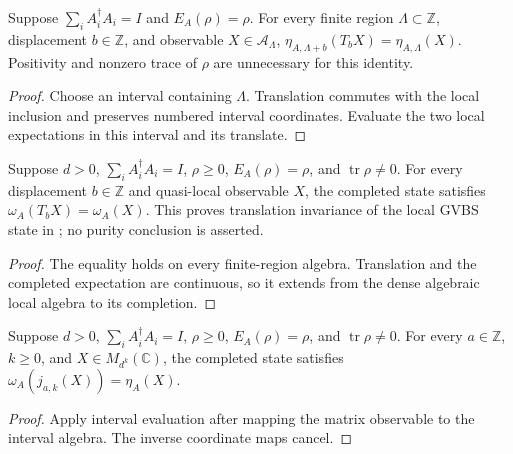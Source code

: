 \begin{lemma}
    \label{thm:mps_finite_region_translation_invariance}
    \leanok
    Suppose $\sum_i A_i^\dagger A_i=I$ and $E_A(\rho)=\rho$.
    For every finite region $\Lambda\subset\mathbb Z$, displacement
    $b\in\mathbb Z$, and observable $X\in\mathcal A_\Lambda$,
    $\eta_{A,\Lambda+b}(T_bX)=\eta_{A,\Lambda}(X)$.
    Positivity and nonzero trace of $\rho$ are unnecessary for this identity.
\end{lemma}
\begin{proof}\leanok
    Choose an interval containing $\Lambda$. Translation commutes with the
    local inclusion and preserves numbered interval coordinates. Evaluate
    the two local expectations in this interval and its translate.
\end{proof}

\begin{lemma}
    \label{thm:mps_quasi_local_translation_invariance}
    \leanok
    Suppose $d>0$, $\sum_i A_i^\dagger A_i=I$, $\rho\geq0$,
    $E_A(\rho)=\rho$, and $\operatorname{tr}\rho\neq0$.
    For every displacement $b\in\mathbb Z$ and quasi-local observable $X$,
    the completed state satisfies $\omega_A(T_bX)=\omega_A(X)$.
    This proves translation invariance of the local GVBS state in
    \cite[Section~3, equations (3.1)--(3.2b)]{Nachtergaele1996Spectral};
    no purity conclusion is asserted.
\end{lemma}
\begin{proof}\leanok
    The equality holds on every finite-region algebra. Translation and the
    completed expectation are continuous, so it extends from the dense
    algebraic local algebra to its completion.
\end{proof}

\begin{lemma}
    \label{thm:mps_quasi_local_interval_expectation}
    \leanok
    Suppose $d>0$, $\sum_i A_i^\dagger A_i=I$, $\rho\geq0$,
    $E_A(\rho)=\rho$, and $\operatorname{tr}\rho\neq0$.
    For every $a\in\mathbb Z$, $k\geq0$, and $X\in M_{d^k}(\mathbb C)$,
    the completed state satisfies $\omega_A(j_{a,k}(X))=\eta_A(X)$.
\end{lemma}
\begin{proof}\leanok
    Apply interval evaluation after mapping the matrix observable to
    the interval algebra. The inverse coordinate maps cancel.
\end{proof}

